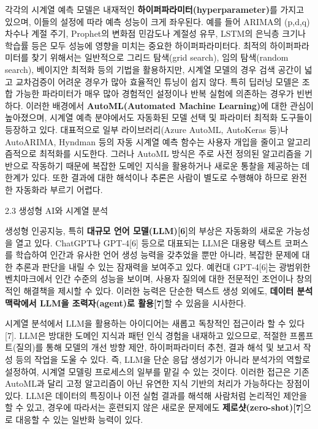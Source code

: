 \documentclass[12pt,ko,a4,]{report}
\begin{document}
각각의 시계열 예측 모델은 내재적인
\textbf{하이퍼파라미터(hyperparameter)}를 가지고 있으며, 이들의 설정에
따라 예측 성능이 크게 좌우된다. 예를 들어 ARIMA의 (p,d,q) 차수나 계절
주기, Prophet의 변화점 민감도나 계절성 유무, LSTM의 은닉층 크기나 학습률
등은 모두 성능에 영향을 미치는 중요한 하이퍼파라미터다. 최적의
하이퍼파라미터를 찾기 위해서는 일반적으로 그리드 탐색(grid search), 임의
탐색(random search), 베이지안 최적화 등의 기법을 활용하지만, 시계열
모델의 경우 검색 공간이 넓고 교차검증이 어려운 경우가 많아 효율적인
튜닝이 쉽지 않다. 특히 딥러닝 모델은 조합 가능한 파라미터가 매우 많아
경험적인 설정이나 반복 실험에 의존하는 경우가 빈번하다. 이러한 배경에서
\textbf{AutoML(Automated Machine Learning)}에 대한 관심이 높아졌으며,
시계열 예측 분야에서도 자동화된 모델 선택 및 파라미터 최적화 도구들이
등장하고 있다. 대표적으로 일부 라이브러리(Azure AutoML, AutoKeras 등)나
AutoARIMA, Hyndman 등의 자동 시계열 예측 함수는 사용자 개입을 줄이고
알고리즘적으로 최적화를 시도한다. 그러나 AutoML 방식은 주로 사전 정의된
알고리즘을 기반으로 작동하기 때문에 복잡한 도메인 지식을 활용하거나
새로운 통찰을 제공하는 데 한계가 있다. 또한 결과에 대한 해석이나 추론은
사람이 별도로 수행해야 하므로 완전한 자동화라 부르기 어렵다.

2.3 생성형 AI와 시계열 분석

생성형 인공지능, 특히 \textbf{대규모 언어 모델(LLM){[}6{]}}의 부상은
자동화의 새로운 가능성을 열고 있다. ChatGPT나 GPT-4{[}6{]} 등으로
대표되는 LLM은 대용량 텍스트 코퍼스를 학습하여 인간과 유사한 언어 생성
능력을 갖추었을 뿐만 아니라, 복잡한 문제에 대한 추론과 판단을 내릴 수
있는 잠재력을 보여주고 있다. 예컨대 GPT-4{[}6{]}는 광범위한 벤치마크에서
인간 수준의 성능을 보이며, 사용자 질의에 대한 전문적인 조언이나 창의적인
해결책을 제시할 수 있다. 이러한 능력은 단순한 텍스트 생성 외에도,
\textbf{데이터 분석 맥락에서 LLM을 조력자(agent)로 활용{[}7{]}}할 수
있음을 시사한다.

시계열 분석에서 LLM을 활용하는 아이디어는 새롭고 독창적인 접근이라 할 수
있다{[}7{]}. LLM은 방대한 도메인 지식과 패턴 인식 경험을 내재하고
있으므로, 적절한 프롬프트(질의)를 통해 모델의 개선 방향 제안,
하이퍼파라미터 추천, 결과 해석 및 보고서 작성 등의 작업을 도울 수 있다.
즉, LLM을 단순 응답 생성기가 아니라 분석가의 역할로 설정하여, 시계열
모델링 프로세스의 일부를 맡길 수 있는 것이다. 이러한 접근은 기존
AutoML과 달리 고정 알고리즘이 아닌 유연한 지식 기반의 처리가 가능하다는
장점이 있다. LLM은 데이터의 특징이나 이전 실험 결과를 해석해 사람처럼
논리적인 제안을 할 수 있고, 경우에 따라서는 훈련되지 않은 새로운
문제에도 \textbf{제로샷(zero-shot){[}7{]}}으로 대응할 수 있는 일반화
능력이 있다.
\end{document}
